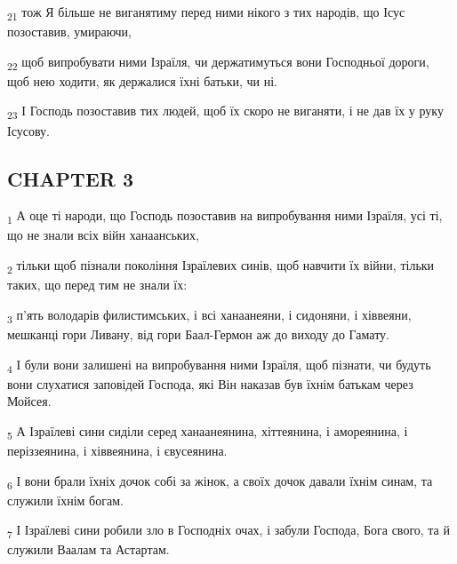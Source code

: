 \begin{tcolorbox}
\textsubscript{21} тож Я більше не виганятиму перед ними нікого з тих народів, що Ісус позоставив, умираючи,
\end{tcolorbox}
\begin{tcolorbox}
\textsubscript{22} щоб випробувати ними Ізраїля, чи держатимуться вони Господньої дороги, щоб нею ходити, як держалися їхні батьки, чи ні.
\end{tcolorbox}
\begin{tcolorbox}
\textsubscript{23} І Господь позоставив тих людей, щоб їх скоро не виганяти, і не дав їх у руку Ісусову.
\end{tcolorbox}
\subsection{CHAPTER 3}
\begin{tcolorbox}
\textsubscript{1} А оце ті народи, що Господь позоставив на випробування ними Ізраїля, усі ті, що не знали всіх війн ханаанських,
\end{tcolorbox}
\begin{tcolorbox}
\textsubscript{2} тільки щоб пізнали покоління Ізраїлевих синів, щоб навчити їх війни, тільки таких, що перед тим не знали їх:
\end{tcolorbox}
\begin{tcolorbox}
\textsubscript{3} п'ять володарів филистимських, і всі ханаанеяни, і сидоняни, і хіввеяни, мешканці гори Ливану, від гори Баал-Гермон аж до виходу до Гамату.
\end{tcolorbox}
\begin{tcolorbox}
\textsubscript{4} І були вони залишені на випробування ними Ізраїля, щоб пізнати, чи будуть вони слухатися заповідей Господа, які Він наказав був їхнім батькам через Мойсея.
\end{tcolorbox}
\begin{tcolorbox}
\textsubscript{5} А Ізраїлеві сини сиділи серед ханаанеянина, хіттеянина, і амореянина, і періззеянина, і хіввеянина, і євусеянина.
\end{tcolorbox}
\begin{tcolorbox}
\textsubscript{6} І вони брали їхніх дочок собі за жінок, а своїх дочок давали їхнім синам, та служили їхнім богам.
\end{tcolorbox}
\begin{tcolorbox}
\textsubscript{7} І Ізраїлеві сини робили зло в Господніх очах, і забули Господа, Бога свого, та й служили Ваалам та Астартам.
\end{tcolorbox}

